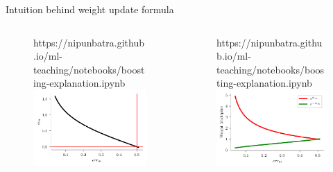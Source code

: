 \documentclass{beamer}
\begin{document}



\begin{frame}{Intuition behind weight update formula}
  \begin{columns}
    \pause \begin{column}{0.5\textwidth}

      \begin{figure}[htp]
        \centering
        \begin{notebookbox}{https://nipunbatra.github.io/ml-teaching/notebooks/boosting-explanation.ipynb}
          \includegraphics[scale=0.55]{../assets/ensemble/figures/alpha-boosting.pdf}
        \end{notebookbox}
      \end{figure}
    \end{column}
    \pause \begin{column}{0.5\textwidth}
      \begin{figure}[htp]
        \centering
        \begin{notebookbox}{https://nipunbatra.github.io/ml-teaching/notebooks/boosting-explanation.ipynb}
          \includegraphics[scale=0.55]{../assets/ensemble/figures/alpha-boosting-weight.pdf}

\end{notebookbox}
\end{figure}
\end{column}
\end{columns}
\end{frame}
\end{document}
